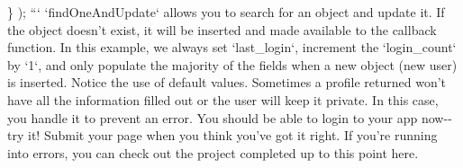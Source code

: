 \documentclass{article}%
\begin{document}
  \}\newline%
);\newline%
```\newline%
`findOneAndUpdate` allows you to search for an object and update it. If the object doesn't exist, it will be inserted and made available to the callback function. In this example, we always set `last\_login`, increment the `login\_count` by `1`, and only populate the majority of the fields when a new object (new user) is inserted. Notice the use of default values. Sometimes a profile returned won't have all the information filled out or the user will keep it private.  In this case, you handle it to prevent an error.\newline%
You should be able to login to your app now{-}{-}try it!\newline%
Submit your page when you think you've got it right. If you're running into errors, you can check out the project completed up to this point here.\newline%

%
\end{document}
